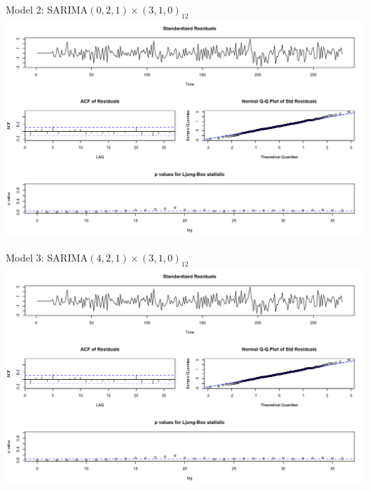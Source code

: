 
\begin{frame}{Model 2: SARIMA\((0,2,1) \times (3,1,0)_{12}\)}
  		\includegraphics[width=\linewidth]{images/seasonalmodel2}
  \end{frame}  

  
  \begin{frame}{Model 3: SARIMA\((4, 2, 1) \times (3,1,0)_{12}\)}
  		\includegraphics[width=\linewidth]{images/seasonalmodel3}
  \end{frame}  

